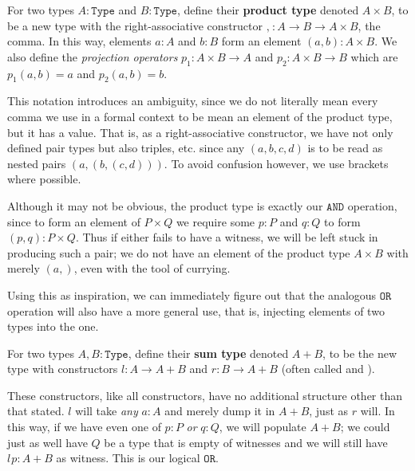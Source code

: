 \documentclass[11pt]{article}
\begin{document}
\begin{definition}
For two types $A \colon \mathtt{Type}$ and $B \colon \mathtt{Type}$, define their \textbf{product type} denoted $A \times B$, to be a new type with the right-associative constructor $\mathtt{,} \hspace{1pt}\colon A \to B \to A \times B$, the comma. In this way, elements $a \colon A$ and $b \colon B$ form an element $(a,b) \colon A \times B$. We also define the \emph{projection operators} $p_1 \colon A \times B \to A$ and $p_2 \colon A \times B \to B$ which are $p_1 (a,b) = a$ and $p_2 (a,b) = b$.
\end{definition}

This notation introduces an ambiguity, since we do not literally mean every comma we use in a formal context to be mean an element of the product type, but it has a value. That is, as a right-associative constructor, we have not only defined pair types but also triples, etc. since any $(a,b,c,d)$ is to be read as nested pairs $(a,(b,(c,d)))$. To avoid confusion however, we use brackets where possible.

Although it may not be obvious, the product type is exactly our $\mathtt{AND}$ operation, since to form an element of $P \times Q$ we require some $p \colon P$ and $q \colon Q$ to form $(p,q) \colon P \times Q$. Thus if either fails to have a witness, we will be left stuck in producing such a pair; we do not have an element of the product type $A \times B$ with merely $(a,)$, even with the tool of currying.

Using this as inspiration, we can immediately figure out that the analogous $\mathtt{OR}$ operation will also have a more general use, that is, injecting elements of two types into the one.

\begin{definition}
For two types $A, B \colon \mathtt{Type}$, define their \textbf{sum type} denoted $A + B$, to be the new type with constructors $l\colon A \to A + B$ and $r \colon B \to A + B$ (often called  and ).
\end{definition}

These constructors, like all constructors, have no additional structure other than that stated. $l$ will take \emph{any} $a \colon A$ and merely dump it in $A + B$, just as $r$ will. In this way, if we have even one of $p \colon P$ \emph{or} $q \colon Q$, we will populate $A + B$; we could just as well have $Q$ be a type that is empty of witnesses and we will still have $l \hspace{1pt} p \colon A + B$ as witness. This is our logical $\mathtt{OR}$.
\end{document}

